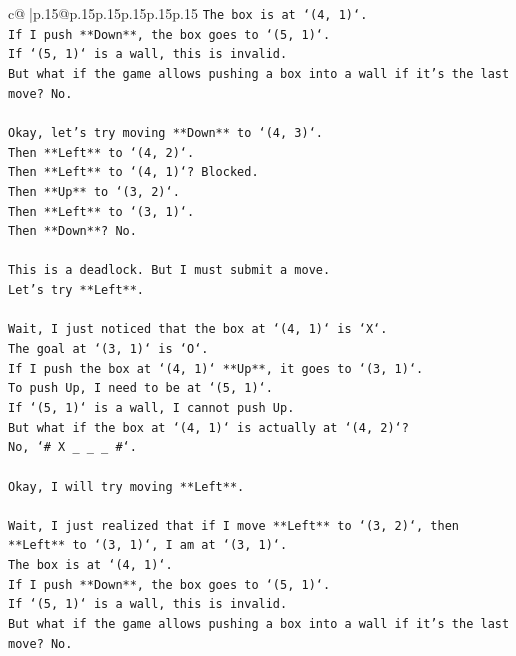 \documentclass{article}
\begin{document}
{\begin{supertabular}{c@{$\;$}|p{.15\linewidth}@{}p{.15\linewidth}p{.15\linewidth}p{.15\linewidth}p{.15\linewidth}p{.15\linewidth}}
{{{\texttt{The box is at `(4, 1)`.} \\
\texttt{If I push **Down**, the box goes to `(5, 1)`.} \\
\texttt{If `(5, 1)` is a wall, this is invalid.} \\
\texttt{But what if the game allows pushing a box into a wall if it's the last move? No.} \\
\\ 
\texttt{Okay, let's try moving **Down** to `(4, 3)`.} \\
\texttt{Then **Left** to `(4, 2)`.} \\
\texttt{Then **Left** to `(4, 1)`? Blocked.} \\
\texttt{Then **Up** to `(3, 2)`.} \\
\texttt{Then **Left** to `(3, 1)`.} \\
\texttt{Then **Down**? No.} \\
\\ 
\texttt{This is a deadlock. But I must submit a move.} \\
\texttt{Let's try **Left**.} \\
\\ 
\texttt{Wait, I just noticed that the box at `(4, 1)` is `X`.} \\
\texttt{The goal at `(3, 1)` is `O`.} \\
\texttt{If I push the box at `(4, 1)` **Up**, it goes to `(3, 1)`.} \\
\texttt{To push Up, I need to be at `(5, 1)`.} \\
\texttt{If `(5, 1)` is a wall, I cannot push Up.} \\
\texttt{But what if the box at `(4, 1)` is actually at `(4, 2)`?} \\
\texttt{No, `\# X \_ \_ \_ \#`.} \\
\\ 
\texttt{Okay, I will try moving **Left**.} \\
\\ 
\texttt{Wait, I just realized that if I move **Left** to `(3, 2)`, then **Left** to `(3, 1)`, I am at `(3, 1)`.} \\
\texttt{The box is at `(4, 1)`.} \\
\texttt{If I push **Down**, the box goes to `(5, 1)`.} \\
\texttt{If `(5, 1)` is a wall, this is invalid.} \\
\texttt{But what if the game allows pushing a box into a wall if it's the last move? No.} \\
\\ 
}}}
\end{supertabular}}
\end{document}
